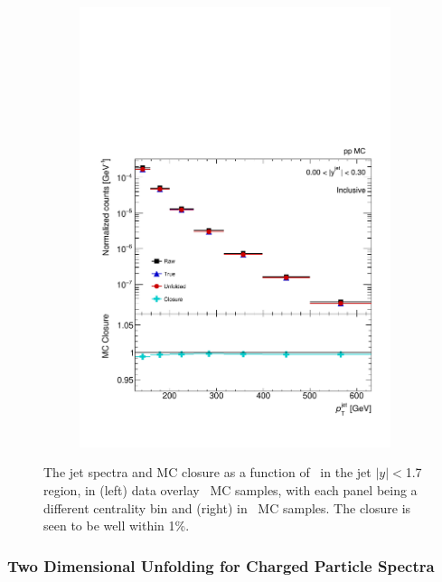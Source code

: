 \begin{figure}
\begin{subfigure}{0.30\textwidth}
\includegraphics[page=5, width=1\textwidth]{figures/main/corrections/spect_closure_pp_MC.pdf}
\caption{}
\label{fig:pp_jetspect_closure}
\end{subfigure}
\caption{The jet spectra and MC closure as a function of \ptjet\ in the jet $|y| < $1.7 region, in (left) data overlay \pbpb\ MC samples, with each panel being a different centrality bin and (right) in \pp\ MC samples.
The closure is seen to be well within 1\%.}
\label{fig:jetspect_closure}
\end{figure}


\subsubsection{Two Dimensional Unfolding for Charged Particle Spectra}
\label{sec:2dunfolding}


